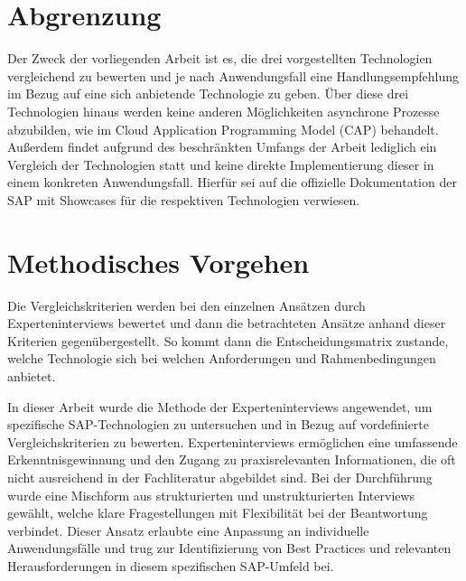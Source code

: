 \section{Abgrenzung}

Der Zweck der vorliegenden Arbeit ist es, die drei vorgestellten Technologien vergleichend zu bewerten und je nach Anwendungsfall eine Handlungsempfehlung im Bezug auf eine sich anbietende Technologie zu geben. Über diese drei Technologien hinaus werden keine anderen Möglichkeiten asynchrone Prozesse abzubilden, wie \zB im Cloud Application Programming Model (CAP) behandelt. Au{\ss}erdem findet aufgrund des beschränkten Umfangs der Arbeit lediglich ein Vergleich der Technologien statt und keine direkte Implementierung dieser in einem konkreten Anwendungsfall. Hierfür sei auf die offizielle Dokumentation der SAP mit Showcases für die respektiven Technologien verwiesen.

\section{Methodisches Vorgehen}

Die Vergleichskriterien werden bei den einzelnen Ansätzen durch Experteninterviews bewertet und dann die betrachteten Ansätze anhand dieser Kriterien gegenübergestellt. So kommt dann die Entscheidungsmatrix zustande, welche Technologie sich bei welchen Anforderungen und Rahmenbedingungen anbietet.

In dieser Arbeit wurde die Methode der Experteninterviews angewendet, um spezifische SAP-Technologien zu untersuchen und in Bezug auf vordefinierte Vergleichskriterien zu bewerten. Experteninterviews ermöglichen eine umfassende Erkenntnisgewinnung und den Zugang zu praxisrelevanten Informationen, die oft nicht ausreichend in der Fachliteratur abgebildet sind. Bei der Durchführung wurde eine Mischform aus strukturierten und unstrukturierten Interviews gewählt, welche klare Fragestellungen mit Flexibilität bei der Beantwortung verbindet. Dieser Ansatz erlaubte eine Anpassung an individuelle Anwendungsfälle und trug zur Identifizierung von Best Practices und relevanten Herausforderungen in diesem spezifischen SAP-Umfeld bei.